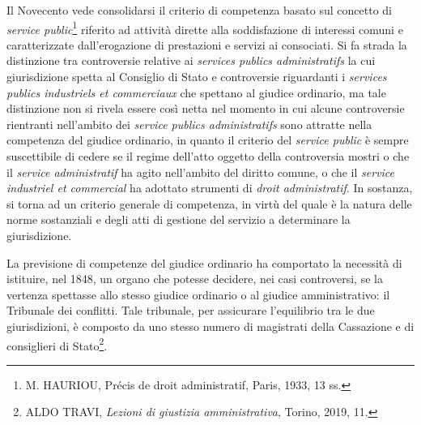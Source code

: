 \documentclass[12pt,it,a4paper,]{report}
\begin{document}
Il Novecento vede consolidarsi il criterio di competenza basato sul
concetto di \emph{service public}\footnote{M. HAURIOU, Précis de droit
  administratif, Paris, 1933, 13 ss.} riferito ad attività dirette alla
soddisfazione di interessi comuni e caratterizzate dall'erogazione di
prestazioni e servizi ai consociati. Si fa strada la distinzione tra
controversie relative ai \emph{services publics administratifs} la cui
giurisdizione spetta al Consiglio di Stato e controversie riguardanti i
\emph{services publics industriels et commerciaux} che spettano al
giudice ordinario, ma tale distinzione non si rivela essere così netta
nel momento in cui alcune controversie rientranti nell'ambito dei
\emph{service publics administratifs} sono attratte nella competenza del
giudice ordinario, in quanto il criterio del \emph{service public} è
sempre suscettibile di cedere se il regime dell'atto oggetto della
controversia mostri o che il \emph{service administratif} ha agito
nell'ambito del diritto comune, o che il \emph{service industriel et
commercial} ha adottato strumenti di \emph{droit administratif}. In
sostanza, si torna ad un criterio generale di competenza, in virtù del
quale è la natura delle norme sostanziali e degli atti di gestione del
servizio a determinare la giurisdizione.

La previsione di competenze del giudice ordinario ha comportato la
necessità di istituire, nel 1848, un organo che potesse decidere, nei
casi controversi, se la vertenza spettasse allo stesso giudice ordinario
o al giudice amministrativo: il Tribunale dei conflitti. Tale tribunale,
per assicurare l'equilibrio tra le due giurisdizioni, è composto da uno
stesso numero di magistrati della Cassazione e di consiglieri di
Stato\footnote{ALDO TRAVI, \emph{Lezioni di giustizia amministrativa},
  Torino, 2019, 11.}.
\end{document}
